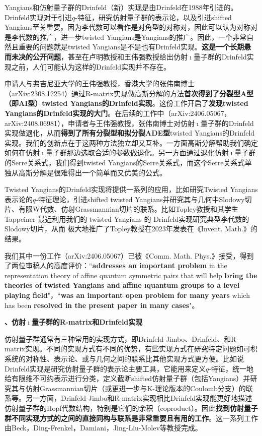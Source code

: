 \documentclass[12pt,UTF8,AutoFakeBold=4,a4paper]{ctexart}
\begin{document}
Yangians和仿射量子群的Drinfeld（新）实现是由Drinfeld在1988年引进的。Drinfeld实现对于引进$q$-特征，研究仿射量子群的表示论，以及引进shifted Yangians至关重要。因为李代数可以看作是对角型的对称对，因此可以认为对称对是李代数的推广，进一步twisted Yangians是Yangians的推广。因此，一个非常自然且重要的问题就是twisted Yangians是不是也有Drinfeld实现。\textbf{这是一个长期悬而未决的公开问题}，甚至在卢明教授和王伟强教授给出仿射$\imath$量子群的Drinfeld实现之前，人们可能认为这样的Drinfeld实现并不存在。

申请人与弗吉尼亚大学的王伟强教授，香港大学的张伟南博士（arXiv:2308.12254）通过R-matrix实现做高斯分解的方法\textbf{首次得到了分裂型A型（即AI型）twisted Yangians的Drinfeld实现}。这份工作开启了\textbf{发现twisted Yangians的Drinfeld实现的大门}。在后续的工作中（arXiv:2406.05067，arXiv:2408.06981），申请者与王伟强教授，张伟南博士对仿射$\imath$量子群的Drinfeld实现做退化，从而\textbf{得到了所有分裂型和拟分裂ADE型}twisted Yangians的Drinfeld实现。我们的创新点在于这两种方法独立却又互补。一方面高斯分解帮助我们确定如何在仿射$\imath$量子群那边选取合适的参数做退化。另一方面通过退化仿射$\imath$量子群的Serre关系式，我们得到twisted Yangians的Serre关系式，而这个Serre关系式单独从高斯分解是很难得出一个简单而又优美的公式。

Twisted Yangians的Drinfeld实现将提供一系列的应用，比如研究Twisted Yangians表示论的$q$-特征理论，引进shifted twisted Yangians并研究其与几何中Slodowy切片、有限W代数、仿射Grassmannian切片的联系。比如Topley教授和其学生Tappeiner 最近利用我们的 twisted Yangians 的 Drinfeld实现研究典型李代数的Slodowy切片，从而 极大地推广了Topley教授在2023年发表在《Invent. Math.》的结果。

我们其中一份工作（arXiv:2406.05067）已被《Comm. Math. Phys.》接受，得到了两位审稿人的高度评价：``\textbf{addresses an important problem} in the representation theory of affine
quantum symmetric pairs that will help \textbf{bring the theories of twisted Yangians and affine ıquantum groups to a level playing field}"，``\textbf{was an important open problem for many years} which has been \textbf{resolved in the present paper in many cases}"。

\medskip

\textbf{、仿射$\imath$量子群的R-matrix和Drinfeld实现}

仿射量子群通常有三种常用的实现方式，即Drinfeld-Jimbo、Drinfeld、和R-matrix实现。不同的实现方式有不同的优势，有些实现方式在研究特定问题如可积系统的对称性、表示论、或与几何之间的联系比其他实现方式更方便。比如说Drinfeld实现是研究仿射量子群的表示论主要工具，它能用来定义$q$-特征，统一地给有限维不可约表示进行分类，定义截断shifted仿射量子群（包括Yangians）并研究其与仿射Grassmannian切片（或更进一步与K-理论版本的Coulomb分支）的联系等。另一方面，Drinfeld-Jimbo和R-matrix实现相比Drinfeld实现能更好地描述仿射量子群的Hopf代数结构，特别是它们的余积（coproduct）。因此\textbf{找到仿射量子群不同实现方式的之间的直接同构与联系是非常重要且有用的工作}。这一系列工作由Beck，Ding-Frenkel，Damiani，Jing-Liu-Molev等教授完成。
\end{document}
